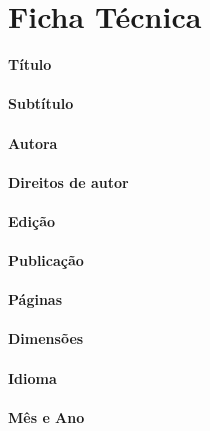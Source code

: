 \newpage

\thispagestyle{empty}

\markright{}
\section*{Ficha Técnica}

\vspace{10pt}

\textbf{Título} \\
\DocTitle \\[5pt]
\textbf{Subtítulo} \\
\DocSubtitle \\[5pt]
\textbf{Autora} \\
\DocAuthor \\[5pt]
\textbf{Direitos de autor} \\
\DocRights \\[5pt]
\textbf{Edição} \\
\DocEdition \\[5pt]
\textbf{Publicação} \\
\DocPublication \\[5pt]
\textbf{Páginas} \\
\DocPages \\[5pt]
\textbf{Dimensões} \\
\DocDimensions \\[5pt]
\textbf{Idioma} \\
\DocLanguage \\[5pt]
\textbf{Mês e Ano} \\
\DocDate \\[5pt]
